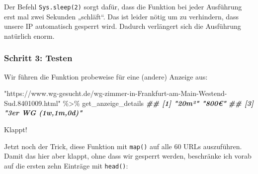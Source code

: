 \documentclass[
  ngerman,
]{article}
\newenvironment{Shaded}{\begin{snugshade}}{\end{snugshade}}
\newcommand{\DocumentationTok}[1]{\textcolor[rgb]{0.56,0.35,0.01}{\textbf{\textit{#1}}}}
\newcommand{\NormalTok}[1]{#1}
\newcommand{\SpecialCharTok}[1]{\textcolor[rgb]{0.00,0.00,0.00}{#1}}
\newcommand{\StringTok}[1]{\textcolor[rgb]{0.31,0.60,0.02}{#1}}
\begin{document}
Der Befehl \texttt{Sys.sleep(2)} sorgt dafür, dass die Funktion bei jeder Ausführung erst mal zwei Sekunden „schläft``. Das ist leider nötig um zu verhindern, dass unsere IP automatisch gesperrt wird. Dadurch verlängert sich die Ausführung natürlich enorm.

\hypertarget{schritt-3-testen-1}{%
\subsubsection{Schritt 3: Testen}\label{schritt-3-testen-1}}

Wir führen die Funktion probeweise für eine (andere) Anzeige aus:

\begin{Shaded}
\begin{Highlighting}[]
\StringTok{"https://www.wg{-}gesucht.de/wg{-}zimmer{-}in{-}Frankfurt{-}am{-}Main{-}Westend{-}Sud.8401009.html"} \SpecialCharTok{\%\textgreater{}\%}
\NormalTok{  get\_anzeige\_details}
\DocumentationTok{\#\# [1] "20m²"              "800€"             }
\DocumentationTok{\#\# [3] "3er WG (1w,1m,0d)"}
\end{Highlighting}
\end{Shaded}

Klappt!

Jetzt noch der Trick, diese Funktion mit \texttt{map()} auf alle 60 URLs auszuführen. Damit das hier aber klappt, ohne dass wir gesperrt werden, beschränke ich vorab auf die ersten zehn Einträge mit \texttt{head()}:
\end{document}
